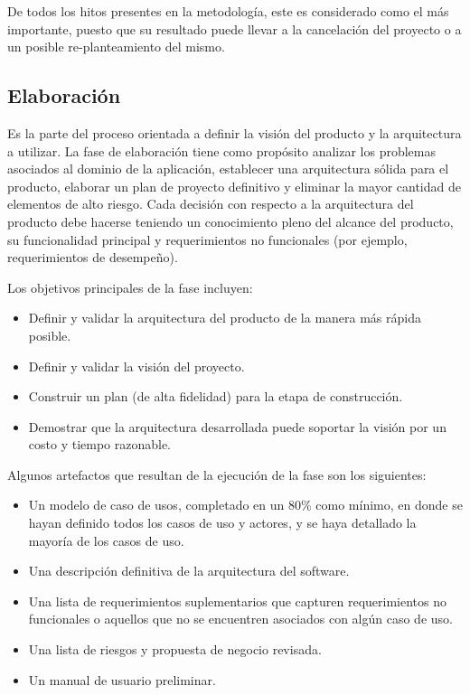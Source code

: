 De todos los hitos presentes en la metodología, este es considerado como el más importante, puesto que su resultado puede llevar a la cancelación del proyecto o a un posible re-planteamiento del mismo.

\subsection{Elaboración}
Es la parte del proceso orientada a definir la visión del producto y la arquitectura a utilizar. \cite{rupKruchten} La fase de elaboración tiene como propósito analizar los problemas asociados al dominio de la aplicación, establecer una arquitectura sólida para el producto, elaborar un plan de proyecto definitivo y eliminar la mayor cantidad de elementos de alto riesgo. Cada decisión con respecto a la arquitectura del producto debe hacerse teniendo un conocimiento pleno del alcance del producto, su funcionalidad principal y requerimientos no funcionales (por ejemplo, requerimientos de desempeño).

Los objetivos principales de la fase incluyen:

\begin{itemize}
    \item Definir y validar la arquitectura del producto de la manera más rápida posible.
    \item Definir y validar la visión del proyecto.
    \item Construir un plan (de alta fidelidad) para la etapa de construcción.
    \item Demostrar que la arquitectura desarrollada puede soportar la visión por un costo y tiempo razonable.
\end{itemize}

Algunos artefactos que resultan de la ejecución de la fase son los siguientes:

\begin{itemize}
    \item Un modelo de caso de usos, completado en un 80\% como mínimo, en donde se hayan definido todos los casos de uso y actores, y se haya detallado la mayoría de los casos de uso.
    \item Una descripción definitiva de la arquitectura del software.
    \item Una lista de requerimientos suplementarios que capturen requerimientos no funcionales o aquellos que no se encuentren asociados con algún caso de uso.
    \item Una lista de riesgos y propuesta de negocio revisada.
    \item Un manual de usuario preliminar.
\end{itemize}

